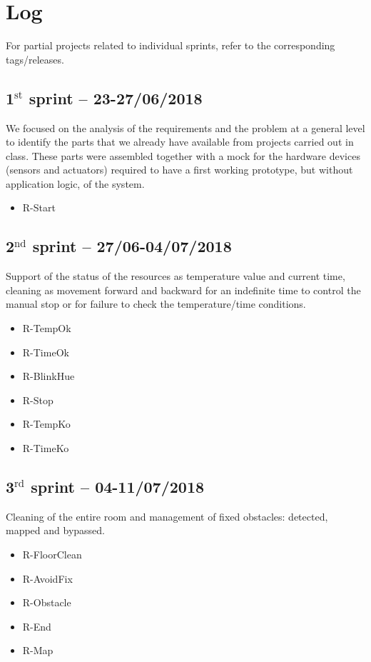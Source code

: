 \section{Log}

For partial projects related to individual sprints, refer to the corresponding tags/releases.

\subsection{1$^{\textrm{st}}$ sprint -- 23-27/06/2018}
We focused on the analysis of the requirements and the problem at a general level to identify the parts that we already have available from projects carried out in class. These parts were assembled together with a mock for the hardware devices (sensors and actuators) required to have a first working prototype, but without application logic, of the system.

\begin{itemize}
	\ttfamily
	\item R-Start
\end{itemize}

\subsection{2$^{\textrm{nd}}$ sprint -- 27/06-04/07/2018}
Support of the status of the resources as temperature value and current time, cleaning as movement forward and backward for an indefinite time to control the manual stop or for failure to check the temperature/time conditions.

\begin{itemize}
	\ttfamily
	\item R-TempOk
	\item R-TimeOk
	\item R-BlinkHue
	\item R-Stop
	\item R-TempKo
	\item R-TimeKo
\end{itemize}

\subsection{3$^{\textrm{rd}}$ sprint -- 04-11/07/2018}
Cleaning of the entire room and management of fixed obstacles: detected, mapped and bypassed.

\begin{itemize}
	\ttfamily
	\item R-FloorClean
	\item R-AvoidFix
	\item R-Obstacle
	\item R-End
	\item R-Map
\end{itemize}


